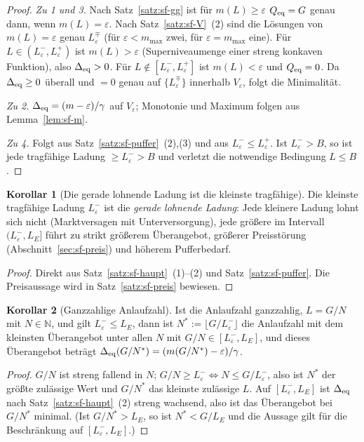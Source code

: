\documentclass[a4paper, 12pt, twoside, openright]{report}
\theoremstyle{definition}
\theoremstyle{definition}
\newtheorem{korollar}{Korollar}[chapter]
\newcommand{\N}{\mathbb{N}}
\begin{document}
\begin{proof}
\emph{Zu 1 und 3.} Nach Satz~\ref{satz:sf-gg} ist für $m(L)\ge\varepsilon$
$Q_{\rm eq}=G$ genau dann, wenn $m(L)=\varepsilon$. Nach Satz~\ref{satz:sf-V}~(2)
sind die Lösungen von $m(L)=\varepsilon$ genau $L_\varepsilon^\mp$ (für
$\varepsilon<m_{\max}$ zwei, für $\varepsilon=m_{\max}$ eine). Für
$L\in(L_\varepsilon^-,L_\varepsilon^+)$ ist $m(L)>\varepsilon$ (Superniveaumenge
einer streng konkaven Funktion), also $\Delta_{\rm eq}>0$. Für
$L\notin[L_\varepsilon^-,L_\varepsilon^+]$ ist $m(L)<\varepsilon$ und
$Q_{\rm eq}=0$. Da $\Delta_{\rm eq}\ge0$ überall und $=0$ genau auf
$\{L_\varepsilon^\mp\}$ innerhalb $V_\varepsilon$, folgt die Minimalität.

\emph{Zu 2.} $\Delta_{\rm eq}=(m-\varepsilon)/\gamma$ auf $V_\varepsilon$; Monotonie und
Maximum folgen aus Lemma~\ref{lem:sf-m}.

\emph{Zu 4.} Folgt aus Satz~\ref{satz:sf-puffer}~(2),(3) und aus
$L_\varepsilon^-\le L_\varepsilon^+$. Ist $L_\varepsilon^->B$, so ist jede tragfähige
Ladung $\ge L_\varepsilon^->B$ und verletzt die notwendige Bedingung $L\le B$.
\end{proof}

\begin{korollar}[Die gerade lohnende Ladung ist die kleinste tragfähige]
\label{kor:sf-klein}
Die kleinste tragfähige Ladung $L_\varepsilon^-$ ist die \emph{gerade lohnende
Ladung}: Jede kleinere Ladung lohnt sich nicht (Marktversagen mit
Unterversorgung), jede größere im Intervall $(L_\varepsilon^-,L_E]$ führt zu
strikt größerem Überangebot, größerer Preisstörung
(Abschnitt~\ref{sec:sf-preis}) und höherem Pufferbedarf.
\end{korollar}

\begin{proof}
Direkt aus Satz~\ref{satz:sf-haupt}~(1)--(2) und Satz~\ref{satz:sf-puffer}.
Die Preisaussage wird in Satz~\ref{satz:sf-preis} bewiesen.
\end{proof}

\begin{korollar}[Ganzzahlige Anlaufzahl]\label{kor:sf-int}
Ist die Anlaufzahl ganzzahlig, $L=G/N$ mit $N\in\N$, und gilt $L_\varepsilon^-\le L_E$,
dann ist $N^*:=\lfloor G/L_\varepsilon^-\rfloor$ die Anlaufzahl mit dem kleinsten
Überangebot unter allen $N$ mit $G/N\in[L_\varepsilon^-,L_E]$, und dieses
Überangebot beträgt $\Delta_{\rm eq}(G/N^*)=(m(G/N^*)-\varepsilon)/\gamma$.
\end{korollar}

\begin{proof}
$G/N$ ist streng fallend in $N$; $G/N\ge L_\varepsilon^-\iff N\le G/L_\varepsilon^-$,
also ist $N^*$ der größte zulässige Wert und $G/N^*$ das kleinste zulässige $L$.
Auf $[L_\varepsilon^-,L_E]$ ist $\Delta_{\rm eq}$ nach Satz~\ref{satz:sf-haupt}~(2) streng
wachsend, also ist das Überangebot bei $G/N^*$ minimal. (Ist $G/N^*>L_E$, so ist
$N^*<G/L_E$ und die Aussage gilt für die Beschränkung auf $[L_\varepsilon^-,L_E]$.)
\end{proof}
\end{document}
